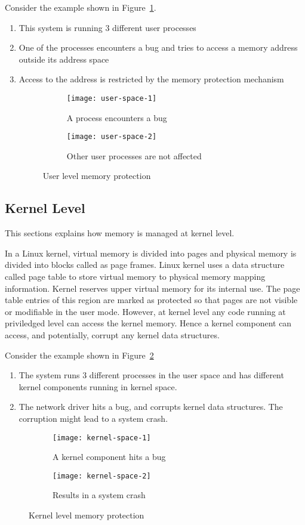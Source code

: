 Consider the example shown in Figure~\ref{fig:User space}.
\begin{enumerate}
\item This system is running 3 different user processes
\item One of the processes encounters a bug and tries to access a memory address outside its address space
\item Access to the address is restricted by the memory protection mechanism
\begin{figure}[!ht]
    \centering
    \begin{subfigure}[b]{0.49\textwidth}
	\texttt{[image: user-space-1]}
	\caption{A process encounters a bug}
    \end{subfigure}
	\hfill
    \begin{subfigure}[b]{0.49\textwidth}
	\texttt{[image: user-space-2]}
	\caption{Other user processes are not affected}
    \end{subfigure}
    \caption{User level memory protection}\label{fig:User space}
\end{figure}
\end{enumerate}

\subsection{Kernel Level}
\label{subsec:kernel level}
This sections explains how memory is managed at kernel level. 

In a Linux kernel, virtual memory is divided into pages and physical memory is divided into blocks called as page frames. Linux kernel uses a data structure called page table to store virtual memory to physical memory mapping information. Kernel reserves upper virtual memory for its internal use. The page table entries of this region are marked as protected so that pages are not visible or modifiable in the user mode. However, at kernel level any code running at priviledged level can access the kernel memory. Hence a kernel component can access, and potentially, corrupt any kernel data structures.

Consider the example shown in Figure~\ref{fig:Kernel space}
\begin{enumerate}
\item The system runs 3 different processes in the user space and has different kernel components running in kernel space.
\item The network driver hits a bug, and corrupts kernel data structures. The corruption might lead to a system crash.
\end{enumerate}
\begin{figure}[!ht]
    \centering
    \begin{subfigure}[b]{0.49\textwidth}
	\texttt{[image: kernel-space-1]}
	\caption{A kernel component hits a bug}
    \end{subfigure}
	\hfill
    \begin{subfigure}[b]{0.49\textwidth}
	\texttt{[image: kernel-space-2]}
	\caption{Results in a system crash}
    \end{subfigure}
    \caption{Kernel level memory protection}\label{fig:Kernel space}
\end{figure}


